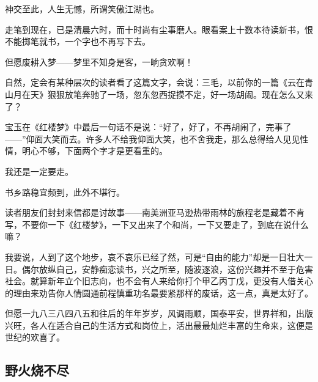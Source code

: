 \par 神交至此，人生无憾，所谓笑傲江湖也。
\par 走笔到现在，已是清晨六时，而十时尚有尘事磨人。眼看案上十数本待读新书，恨不能掷笔就书，一个字也不再写下去。
\par 但愿废耕入梦——梦里不知身是客，一晌贪欢啊！
\par 自然，定会有某种层次的读者看了这篇文字，会说：三毛，以前你的一篇《云在青山月在天》狠狠放笔奔驰了一场，忽东忽西捉摸不定，好一场胡闹。现在怎么又来了？
\par 宝玉在《红楼梦》中最后一句话不是说：“好了，好了，不再胡闹了，完事了——”仰面大笑而去。许多人不给我仰面大笑，也不舍我走，那么总得给人见见性情，明心不够，下面两个字才是更看重的。
\par 我还是一定要走。
\par 书乡路稳宜频到，此外不堪行。
\par 读者朋友们封封来信都是讨故事——南美洲亚马逊热带雨林的旅程老是藏着不肯写，不要你一下《红楼梦》，一下又出来了个和尚，一下又要走了，到底在说什么嘛？
\par 我要说，人到了这个地步，哀不哀乐已经了然，可是“自由的能力”却是一日壮大一日。偶尔放纵自己，安静痴恋读书，兴之所至，随波逐浪，这份兴趣并不至于危害社会。就算新年立个旧志向，也不会有人来给你打个甲乙丙丁戊，更没有人借关心的理由来劝告你人情圆通前程慎重功名最要紧那样的废话，这一点，真是太好了。
\par 但愿一九八三八四八五和往后的年年岁岁，风调雨顺，国泰平安，世界祥和，出版兴旺，各人在适合自己的生活方式和岗位上，活出最最灿烂丰富的生命来，这便是世纪的欢喜了。



\subsection{野火烧不尽}

